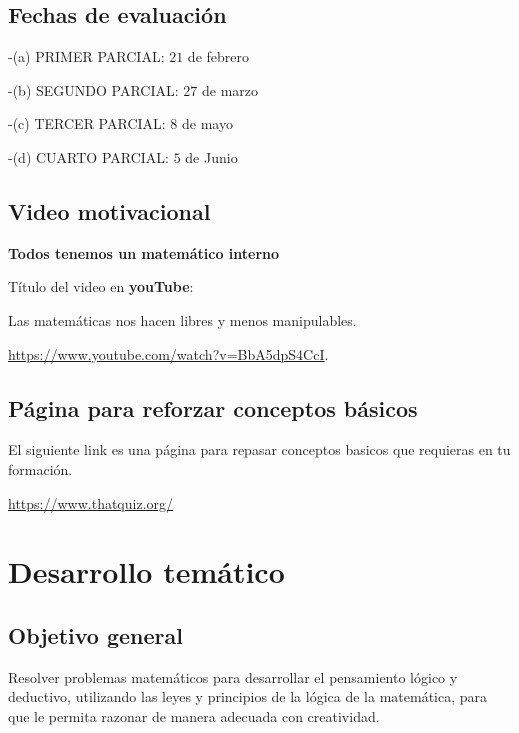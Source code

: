 \documentclass[]{book}
\theoremstyle{definition}
\theoremstyle{definition}
\theoremstyle{definition}
\theoremstyle{remark}
\begin{document}
\hypertarget{fechas-de-evaluaciuxf3n}{%
\section{Fechas de evaluación}\label{fechas-de-evaluaciuxf3n}}

-(a) PRIMER PARCIAL: \(21\) de febrero

-(b) SEGUNDO PARCIAL: \(27\) de marzo

-(c) TERCER PARCIAL: \(8\) de mayo

-(d) CUARTO PARCIAL: \(5\) de Junio

\hypertarget{video-motivacional}{%
\section{Video motivacional}\label{video-motivacional}}

\textbf{Todos tenemos un matemático interno}

Título del video en \textbf{youTube}:

Las matemáticas nos hacen libres y menos manipulables.

\url{https://www.youtube.com/watch?v=BbA5dpS4CcI}.

\hypertarget{puxe1gina-para-reforzar-conceptos-buxe1sicos}{%
\section{Página para reforzar conceptos básicos}\label{puxe1gina-para-reforzar-conceptos-buxe1sicos}}

El siguiente link es una página para repasar conceptos basicos que requieras en tu formación.

\url{https://www.thatquiz.org/}

\hypertarget{desarrollo-temuxe1tico}{%
\chapter{Desarrollo temático}\label{desarrollo-temuxe1tico}}

\hypertarget{objetivo-general}{%
\section{Objetivo general}\label{objetivo-general}}

Resolver problemas matemáticos para desarrollar el pensamiento lógico y deductivo, utilizando las leyes y principios de la lógica de la matemática, para que le permita razonar de manera adecuada con creatividad.
\end{document}
